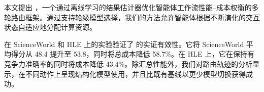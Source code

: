 本文提出 \method，一个通过离线学习的结果估计器优化智能体工作流性能--成本权衡的多轮路由框架。通过支持轮级模型选择，我们的方法允许智能体根据不断演化的交互状态自适应地分配计算资源。

在 ScienceWorld 和 HLE 上的实验验证了 \method 的实证有效性。它将 ScienceWorld 平均得分从 48.4 提升至 53.8，同时将总成本降低 58.7\%。在 HLE 上，它在保持有竞争力准确率的同时将成本降低 43.4\%。除汇总性能外，我们对路由轨迹的分析显示，\method 在不同动作上呈现结构化模型使用，并且比既有基线以更少模型切换获得成功。
